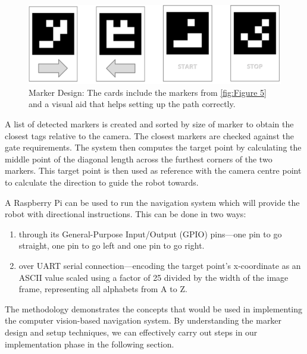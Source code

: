 \documentclass[12pt,a4paper]{report}
\begin{document}
\begin{figure}
    \centering
    \includegraphics[width=1\textwidth]{Images/Tags on card.png}
    \caption[Marker Card Design]{Marker Design: The cards include the markers from \autoref{fig:Figure 5} and a visual aid that helps setting up the path correctly.}
    \label{fig:Figure 6}
\end{figure}

A list of detected markers is created and sorted by size of marker to obtain the closest tags relative to the camera. The closest markers are checked against the gate requirements. The system then computes the target point by calculating the middle point of the diagonal length across the furthest corners of the two markers. This target point is then used as reference with the camera centre point to calculate the direction to guide the robot towards.

\newpage
A Raspberry Pi can be used to run the navigation system which will provide the robot with directional instructions. This can be done in two ways:
\begin{enumerate}
    \item through its General-Purpose Input/Output (GPIO) pins---one pin to go straight, one pin to go left and one pin to go right.
    \item over UART serial connection---encoding the target point's x-coordinate as an ASCII value scaled using a factor of 25 divided by the width of the image frame, representing all alphabets from A to Z.
\end{enumerate}

The methodology demonstrates the concepts that would be used in implementing the computer vision-based navigation system. By understanding the marker design and setup techniques, we can effectively carry out steps in our implementation phase in the following section.
\end{document}
